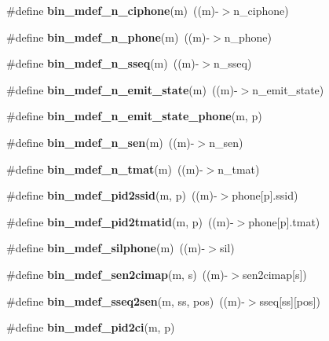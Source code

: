\begin{DoxyCompactItemize}
\item 
\#define {\bfseries bin\+\_\+mdef\+\_\+n\+\_\+ciphone}(m)~((m)-\/$>$n\+\_\+ciphone)\label{bin__mdef_8h_a3bf9a556739b5b6651eb2bfa72fcb427}

\item 
\#define {\bfseries bin\+\_\+mdef\+\_\+n\+\_\+phone}(m)~((m)-\/$>$n\+\_\+phone)\label{bin__mdef_8h_af85788051ca16ad0d4be0bb4740ecf37}

\item 
\#define {\bfseries bin\+\_\+mdef\+\_\+n\+\_\+sseq}(m)~((m)-\/$>$n\+\_\+sseq)\label{bin__mdef_8h_aff6ddbc2ff917ad3aa8cfebf354307d1}

\item 
\#define {\bfseries bin\+\_\+mdef\+\_\+n\+\_\+emit\+\_\+state}(m)~((m)-\/$>$n\+\_\+emit\+\_\+state)\label{bin__mdef_8h_ad15b963c74030cb2826c73c55ad5fe6b}

\item 
\#define {\bfseries bin\+\_\+mdef\+\_\+n\+\_\+emit\+\_\+state\+\_\+phone}(m,  p)
\item 
\#define {\bfseries bin\+\_\+mdef\+\_\+n\+\_\+sen}(m)~((m)-\/$>$n\+\_\+sen)\label{bin__mdef_8h_a74b85bdbd4a8e47eba903a2c9f7ce968}

\item 
\#define {\bfseries bin\+\_\+mdef\+\_\+n\+\_\+tmat}(m)~((m)-\/$>$n\+\_\+tmat)\label{bin__mdef_8h_ab3acd37e62c109c4abcd933a713e837f}

\item 
\#define {\bfseries bin\+\_\+mdef\+\_\+pid2ssid}(m,  p)~((m)-\/$>$phone[p].ssid)\label{bin__mdef_8h_ae2377a0b44df75e0f7e0fd20ca143fea}

\item 
\#define {\bfseries bin\+\_\+mdef\+\_\+pid2tmatid}(m,  p)~((m)-\/$>$phone[p].tmat)\label{bin__mdef_8h_ae5c4319a3245f65ea397a7b1cad4ac79}

\item 
\#define {\bfseries bin\+\_\+mdef\+\_\+silphone}(m)~((m)-\/$>$sil)\label{bin__mdef_8h_a0fe77933739b960287855bdd4451aa09}

\item 
\#define {\bfseries bin\+\_\+mdef\+\_\+sen2cimap}(m,  s)~((m)-\/$>$sen2cimap[s])\label{bin__mdef_8h_a3849ea9a9101990d045b8afcc0c273fb}

\item 
\#define {\bfseries bin\+\_\+mdef\+\_\+sseq2sen}(m,  ss,  pos)~((m)-\/$>$sseq[ss][pos])\label{bin__mdef_8h_aab50d23120a2310909697b7159360d80}

\item 
\#define {\bfseries bin\+\_\+mdef\+\_\+pid2ci}(m,  p)
\end{DoxyCompactItemize}
